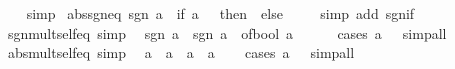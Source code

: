 \begin{isabellebody}
%
\isadelimproof
\ \ %
\endisadelimproof
%
\isatagproof
{}\isamarkupfalse%
\ simp%
\endisatagproof
{\isafoldproof}%
%
\isadelimproof
\isanewline
%
\endisadelimproof
\isanewline
{}\isamarkupfalse%
\ abs{\isacharunderscore}{\kern0pt}sgn{\isacharunderscore}{\kern0pt}eq{\isacharcolon}{\kern0pt}\ {\isachardoublequoteopen}{\isasymbar}sgn\ a{\isasymbar}\ {\isacharequal}{\kern0pt}\ {\isacharparenleft}{\kern0pt}if\ a\ {\isacharequal}{\kern0pt}\ {}\ then\ {}\ else\ {}{\isacharparenright}{\kern0pt}{\isachardoublequoteclose}\isanewline
%
\isadelimproof
\ \ %
\endisadelimproof
%
\isatagproof
{}\isamarkupfalse%
\ {\isacharparenleft}{\kern0pt}simp\ add{\isacharcolon}{\kern0pt}\ sgn{\isacharunderscore}{\kern0pt}if{\isacharparenright}{\kern0pt}%
\endisatagproof
{\isafoldproof}%
%
\isadelimproof
\isanewline
%
\endisadelimproof
\isanewline
{}\isamarkupfalse%
\ sgn{\isacharunderscore}{\kern0pt}mult{\isacharunderscore}{\kern0pt}self{\isacharunderscore}{\kern0pt}eq\ {\isacharbrackleft}{\kern0pt}simp{\isacharbrackright}{\kern0pt}{\isacharcolon}{\kern0pt}\isanewline
\ \ {\isachardoublequoteopen}sgn\ a\ {\isacharasterisk}{\kern0pt}\ sgn\ a\ {\isacharequal}{\kern0pt}\ of{\isacharunderscore}{\kern0pt}bool\ {\isacharparenleft}{\kern0pt}a\ {\isasymnoteq}\ {}{\isacharparenright}{\kern0pt}{\isachardoublequoteclose}\isanewline
%
\isadelimproof
\ \ %
\endisadelimproof
%
\isatagproof
{}\isamarkupfalse%
\ {\isacharparenleft}{\kern0pt}cases\ {\isachardoublequoteopen}a\ {\isachargreater}{\kern0pt}\ {}{\isachardoublequoteclose}{\isacharparenright}{\kern0pt}\ simp{\isacharunderscore}{\kern0pt}all%
\endisatagproof
{\isafoldproof}%
%
\isadelimproof
\isanewline
%
\endisadelimproof
\isanewline
{}\isamarkupfalse%
\ abs{\isacharunderscore}{\kern0pt}mult{\isacharunderscore}{\kern0pt}self{\isacharunderscore}{\kern0pt}eq\ {\isacharbrackleft}{\kern0pt}simp{\isacharbrackright}{\kern0pt}{\isacharcolon}{\kern0pt}\isanewline
\ \ {\isachardoublequoteopen}{\isasymbar}a{\isasymbar}\ {\isacharasterisk}{\kern0pt}\ {\isasymbar}a{\isasymbar}\ {\isacharequal}{\kern0pt}\ a\ {\isacharasterisk}{\kern0pt}\ a{\isachardoublequoteclose}\isanewline
%
\isadelimproof
\ \ %
\endisadelimproof
%
\isatagproof
{}\isamarkupfalse%
\ {\isacharparenleft}{\kern0pt}cases\ {\isachardoublequoteopen}a\ {\isachargreater}{\kern0pt}\ {}{\isachardoublequoteclose}{\isacharparenright}{\kern0pt}\ simp{\isacharunderscore}{\kern0pt}all%
\endisatagproof
{\isafoldproof}%
%
\isadelimproof

\end{isabellebody}
